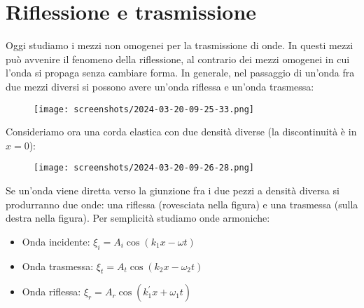 \section{Riflessione e trasmissione}
Oggi studiamo i mezzi non omogenei per la trasmissione di onde. In questi mezzi può avvenire il fenomeno della riflessione, al contrario dei mezzi omogenei in cui l'onda si propaga senza cambiare forma. In generale, nel passaggio di un'onda fra due mezzi diversi si possono avere un'onda riflessa e un'onda trasmessa:

\begin{figure}[H]
	\centering
	\texttt{[image: screenshots/2024-03-20-09-25-33.png]}
\end{figure}

Consideriamo ora una corda elastica con due densità diverse (la discontinuità è in \(x=0\)):

\begin{figure}[H]
	\centering
	\texttt{[image: screenshots/2024-03-20-09-26-28.png]}
\end{figure}
Se un'onda viene diretta verso la giunzione fra i due pezzi a densità diversa si produrranno due onde: una riflessa (rovesciata nella figura) e una trasmessa (sulla destra nella figura). Per semplicità studiamo onde armoniche:

\begin{itemize}
	\item Onda incidente: \(\xi _i = A_i \cos (k_1 x -\omega t)\) 	
	\item Onda trasmessa: \(\xi _t = A_t \cos (k_2 x - \omega _2 t)\) 
	\item Onda riflessa: \(\xi _r = A_r \cos (k_1^{\prime} x + \omega _1 t)\) 
\end{itemize}

